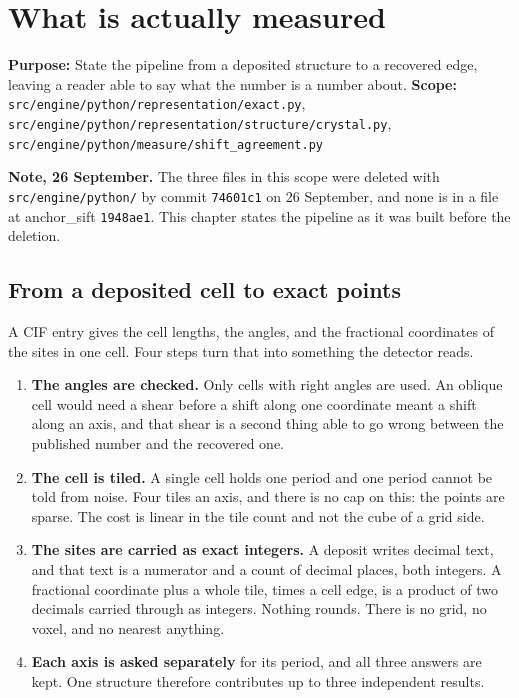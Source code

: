\chapter{What is actually measured}

\textbf{Purpose:} State the pipeline from a deposited structure to a recovered edge, leaving a reader able to say what the number is a number about.
\textbf{Scope:} \texttt{src/\allowbreak{}engine/\allowbreak{}python/\allowbreak{}representation/\allowbreak{}exact.\allowbreak{}py}, \texttt{src/\allowbreak{}engine/\allowbreak{}python/\allowbreak{}representation/\allowbreak{}structure/\allowbreak{}crystal.\allowbreak{}py}, \texttt{src/\allowbreak{}engine/\allowbreak{}python/\allowbreak{}measure/\allowbreak{}shift\_\allowbreak{}agreement.\allowbreak{}py}

\textbf{Note, 26 September.} The three files in this scope were deleted with \texttt{src/\allowbreak{}engine/\allowbreak{}python/} by commit \texttt{74601c1} on 26 September, and none is in a file at anchor\_sift \texttt{1948ae1}. This chapter states the pipeline as it was built before the deletion.

\section{From a deposited cell to exact points}

A CIF entry gives the cell lengths, the angles, and the fractional coordinates of the sites in one cell. Four steps turn that into something the detector reads.

\begin{enumerate}
\item \textbf{The angles are checked.} Only cells with right angles are used. An oblique cell would need a shear before a shift along one coordinate meant a shift along an axis, and that shear is a second thing able to go wrong between the published number and the recovered one.
\item \textbf{The cell is tiled.} A single cell holds one period and one period cannot be told from noise. Four tiles an axis, and there is no cap on this: the points are sparse. The cost is linear in the tile count and not the cube of a grid side.
\item \textbf{The sites are carried as exact integers.} A deposit writes decimal text, and that text is a numerator and a count of decimal places, both integers. A fractional coordinate plus a whole tile, times a cell edge, is a product of two decimals carried through as integers. Nothing rounds. There is no grid, no voxel, and no nearest anything.
\item \textbf{Each axis is asked separately} for its period, and all three answers are kept. One structure therefore contributes up to three independent results.
\end{enumerate}

